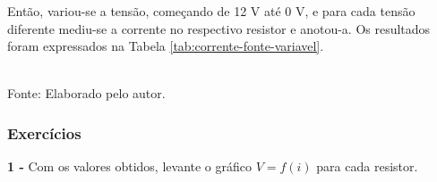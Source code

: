 \documentclass[12pt]{article}
\begin{document}
Então, variou-se a tensão, começando de 12 V até 0 V, e para cada tensão diferente mediu-se a corrente no respectivo resistor e anotou-a. Os resultados foram expressados na Tabela \ref{tab:corrente-fonte-variavel}.

\begin{table}[H]
    \caption{Corrente que passa por cada resistor conforme tensão.}
    \label{tab:corrente-fonte-variavel}
    \centering
    \\
    \footnotesize{Fonte: Elaborado pelo autor.}
\end{table}

\subsubsection{Exercícios}

\textbf{1 - }Com os valores obtidos, levante o gráfico $V=f(i)$ para cada resistor.
\end{document}
